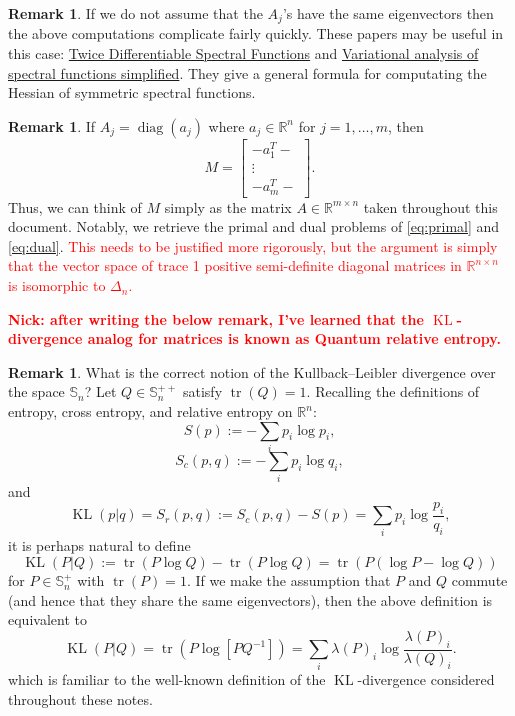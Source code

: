 \documentclass[10pt,a4paper]{article}
\numberwithin{equation}{section}
\theoremstyle{definition}
\newtheorem{remark}[theorem]{Remark}
\def\rr{{\mathbb R}}
\def\Sym{{\mathbb S}}
\DeclareMathOperator{\diag}{diag}
\DeclareMathOperator{\tr}{tr}
\DeclareMathOperator{\KL}{KL}
\begin{document}
\begin{remark}
    If we do not assume that the $A_j$'s have the same eigenvectors then the above computations complicate fairly quickly. These papers may be useful in this case: \hyperlink{https://people.orie.cornell.edu/aslewis/publications/01-twice.pdf}{Twice Differentiable Spectral Functions} and \hyperlink{https://sites.math.washington.edu/~ddrusv/quick_spec.pdf}{Variational analysis of spectral functions simplified}. They give a general formula for computating the Hessian of symmetric spectral functions.
\end{remark}

\begin{remark}
    If $A_j = \diag(a_j)$ where $a_j \in \rr^n$ for $j =1, \dots, m$, then
    \[
    M = \begin{bmatrix}
         - a_1^T -  \\
        \vdots \\
        - a_m^T -
    \end{bmatrix}.
    \]
    Thus, we can think of $M$ simply as the matrix $A \in \rr^{m \times n}$ taken throughout this document. Notably, we retrieve the primal and dual problems of \eqref{eq:primal} and \eqref{eq:dual}. \textcolor{red}{This needs to be justified more rigorously, but the argument is simply that the vector space of trace 1 positive semi-definite diagonal matrices in $\rr^{n \times n}$ is isomorphic to $\Delta_n$.}
\end{remark}

\textbf{\textcolor{red}{Nick: after writing the below remark, I've learned that the $\KL$-divergence analog for matrices is known as Quantum relative entropy.}}
\begin{remark}
    What is the correct notion of the Kullback--Leibler divergence over the space $\Sym_n$? Let $Q \in \Sym_n^{++}$ satisfy $\tr(Q)=1$. Recalling the definitions of entropy, cross entropy, and relative entropy on $\rr^n$:
    \[
    S(p) := - \sum_i p_i \log p_i,
    \]
    \[
    S_c(p,q) := - \sum_i p_i \log q_i,
    \]
    and 
    \[
    \KL(p|q) = S_r(p,q) := S_c(p,q) - S(p) = \sum_i p_i \log \frac{p_i}{q_i},
    \]
    it is perhaps natural to define 
    \[
    \KL(P|Q) := \tr(P \log Q) - \tr(P \log Q) = \tr(P (\log P - \log Q))
    \]
    for $P \in \Sym_n^+$ with $\tr(P) = 1$. If we make the assumption that $P$ and $Q$ commute (and hence that they share the same eigenvectors), then the above definition is equivalent to 
    \[
     \KL(P|Q) =  \tr(P \log [P Q^{-1}] ) = \sum_i \lambda(P)_i \log \frac{\lambda(P)_i}{\lambda(Q)_i}.
    \]
    which is familiar to the well-known definition of the $\KL$-divergence considered throughout these notes. 
    
    \end{remark}
\end{document}
